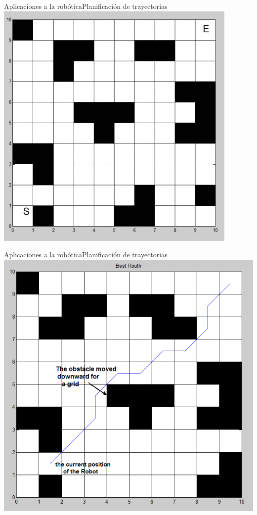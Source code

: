 \documentclass{beamer}
\begin{document}
\begin{frame}{Aplicaciones a la robótica}{Planificación de trayectorias}
	\centering
	\includegraphics[scale=0.4]{path1}
\end{frame}
\begin{frame}{Aplicaciones a la robótica}{Planificación de trayectorias}
	\centering
	\includegraphics[scale=0.3]{path2}
\end{frame}
\end{document}
